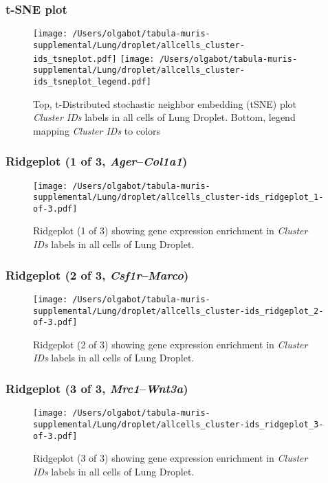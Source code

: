 \clearpage
\subsubsection{t-SNE plot}
\begin{figure}[h]
\centering
\texttt{[image: /Users/olgabot/tabula-muris-supplemental/Lung/droplet/allcells\_cluster-ids\_tsneplot.pdf]}
\texttt{[image: /Users/olgabot/tabula-muris-supplemental/Lung/droplet/allcells\_cluster-ids\_tsneplot\_legend.pdf]}
\caption{Top, t-Distributed stochastic neighbor embedding (tSNE) plot  \emph{Cluster IDs} labels in all cells of Lung Droplet. Bottom, legend mapping \emph{Cluster IDs} to colors}
\end{figure}


\clearpage

\subsubsection{Ridgeplot (1 of 3, \emph{Ager}--\emph{Col1a1})}
\begin{figure}[h]
\centering
\texttt{[image: /Users/olgabot/tabula-muris-supplemental/Lung/droplet/allcells\_cluster-ids\_ridgeplot\_1-of-3.pdf]}

\caption{ Ridgeplot (1 of 3)  showing gene expression enrichment in \emph{Cluster IDs} labels in all cells of Lung Droplet. }
\end{figure}


\clearpage

\subsubsection{Ridgeplot (2 of 3, \emph{Csf1r}--\emph{Marco})}
\begin{figure}[h]
\centering
\texttt{[image: /Users/olgabot/tabula-muris-supplemental/Lung/droplet/allcells\_cluster-ids\_ridgeplot\_2-of-3.pdf]}

\caption{ Ridgeplot (2 of 3)  showing gene expression enrichment in \emph{Cluster IDs} labels in all cells of Lung Droplet. }
\end{figure}


\clearpage

\subsubsection{Ridgeplot (3 of 3, \emph{Mrc1}--\emph{Wnt3a})}
\begin{figure}[h]
\centering
\texttt{[image: /Users/olgabot/tabula-muris-supplemental/Lung/droplet/allcells\_cluster-ids\_ridgeplot\_3-of-3.pdf]}

\caption{ Ridgeplot (3 of 3)  showing gene expression enrichment in \emph{Cluster IDs} labels in all cells of Lung Droplet. }
\end{figure}


